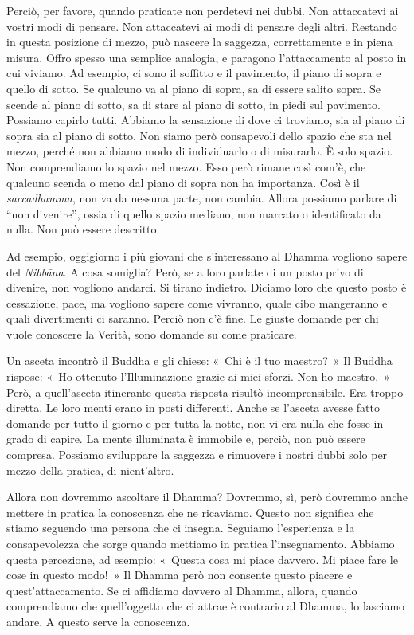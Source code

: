 Perciò, per favore, quando praticate non perdetevi nei dubbi. Non
attaccatevi ai vostri modi di pensare. Non attaccatevi ai modi di
pensare degli altri. Restando in questa posizione di mezzo, può nascere
la saggezza, correttamente e in piena misura. Offro spesso una semplice
analogia, e paragono l'attaccamento al posto in cui viviamo. Ad esempio,
ci sono il soffitto e il pavimento, il piano di sopra e quello di sotto.
Se qualcuno va al piano di sopra, sa di essere salito sopra. Se scende
al piano di sotto, sa di stare al piano di sotto, in piedi sul
pavimento. Possiamo capirlo tutti. Abbiamo la sensazione di dove ci
troviamo, sia al piano di sopra sia al piano di sotto. Non siamo però
consapevoli dello spazio che sta nel mezzo, perché non abbiamo modo di
individuarlo o di misurarlo. È solo spazio. Non comprendiamo lo spazio
nel mezzo. Esso però rimane così com'è, che qualcuno scenda o meno dal
piano di sopra non ha importanza. Così è il \emph{saccadhamma}, non va
da nessuna parte, non cambia. Allora possiamo parlare di ``non
divenire'', ossia di quello spazio mediano, non marcato o identificato
da nulla. Non può essere descritto.

Ad esempio, oggigiorno i più giovani che s'interessano al Dhamma
vogliono sapere del \emph{Nibbāna}. A cosa somiglia? Però, se a loro
parlate di un posto privo di divenire, non vogliono andarci. Si tirano
indietro. Diciamo loro che questo posto è cessazione, pace, ma vogliono
sapere come vivranno, quale cibo mangeranno e quali divertimenti ci
saranno. Perciò non c'è fine. Le giuste domande per chi vuole conoscere
la Verità, sono domande su come praticare.

Un asceta incontrò il Buddha e gli chiese: «~Chi è il tuo maestro?~» Il
Buddha rispose: «~Ho ottenuto l'Illuminazione grazie ai miei sforzi. Non
ho maestro.~» Però, a quell'asceta itinerante questa risposta risultò
incomprensibile. Era troppo diretta. Le loro menti erano in posti
differenti. Anche se l'asceta avesse fatto domande per tutto il giorno e
per tutta la notte, non vi era nulla che fosse in grado di capire. La
mente illuminata è immobile e, perciò, non può essere compresa. Possiamo
sviluppare la saggezza e rimuovere i nostri dubbi solo per mezzo della
pratica, di nient'altro.

Allora non dovremmo ascoltare il Dhamma? Dovremmo, sì, però dovremmo
anche mettere in pratica la conoscenza che ne ricaviamo. Questo non
significa che stiamo seguendo una persona che ci insegna. Seguiamo
l'esperienza e la consapevolezza che sorge quando mettiamo in pratica
l'insegnamento. Abbiamo questa percezione, ad esempio: «~Questa cosa mi
piace davvero. Mi piace fare le cose in questo modo!~» Il Dhamma però
non consente questo piacere e quest'attaccamento. Se ci affidiamo
davvero al Dhamma, allora, quando comprendiamo che quell'oggetto che ci
attrae è contrario al Dhamma, lo lasciamo andare. A questo serve la
conoscenza.

